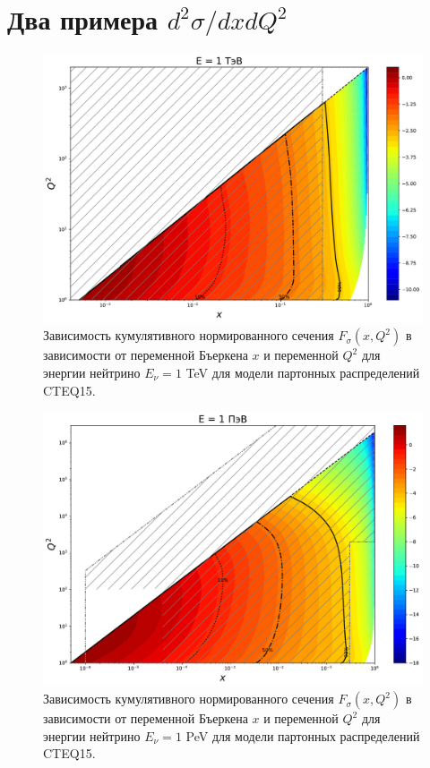 \section{Два примера $d^2\sigma/dxdQ^2$}
\label{sec:examples_extrapolated_region}
\begin{figure}[!h]
\centering
\includegraphics[width=0.97\linewidth]{images/NuProp/cdfxq2_cc_proton_CT18ZNNLO_14_1000.pdf}
\caption{Зависимость кумулятивного нормированного сечения $F_{\sigma}(x,Q^2)$ в зависимости от переменной Бъеркена $x$ и переменной $Q^2$ для энергии нейтрино $E_{\nu} = 1$ TeV для модели партонных распределений CTEQ15\cite{ncteq15}. }
\label{Pp3}
\end{figure}
\begin{figure}[!h]
\centering
\includegraphics[width=0.97\linewidth]{images/NuProp/cdfxq2_cc_proton_CT18ZNNLO_14_1000000.pdf}
\caption{Зависимость кумулятивного нормированного сечения $F_{\sigma}(x,Q^2)$ в зависимости от переменной Бъеркена $x$ и переменной $Q^2$ для энергии нейтрино $E_{\nu} = 1$ PeV для модели партонных распределений CTEQ15\cite{ncteq15}.}
\label{Pp6}
\end{figure}
